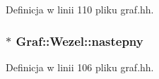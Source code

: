 \-Definicja w linii 110 pliku graf.\-hh.

\hypertarget{class_graf_1_1_wezel_a81da02b086fccaf3d497b0eb13376c38}{
\subsubsection[{nastepny}]{$\ast$ {\bf \-Graf\-::\-Wezel\-::nastepny}}}\label{class_graf_1_1_wezel_a81da02b086fccaf3d497b0eb13376c38}


\-Definicja w linii 106 pliku graf.\-hh.

